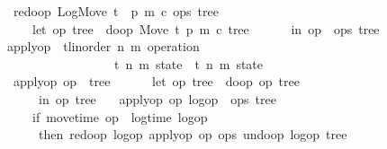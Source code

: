 \documentclass[sigconf]{acmart}
\renewcommand{\isacartoucheopen}{}
\renewcommand{\isacartoucheclose}{}
\begin{document}
\begin{figure}
\begin{isabellebody}
\ \ {\isacartoucheopen}redo{\isacharunderscore}op\ {\isacharparenleft}LogMove\ t\ {\isacharunderscore}\ p\ m\ c{\isacharparenright}\ {\isacharparenleft}ops{\isacharcomma}\ tree{\isacharparenright}\ {\isacharequal}\isanewline
\ \ \ \ \ {\isacharparenleft}let\ {\isacharparenleft}op{}{\isacharcomma}\ tree{}{\isacharparenright}\ {\isacharequal}\ do{\isacharunderscore}op\ {\isacharparenleft}Move\ t\ p\ m\ c{\isacharcomma}\ tree{\isacharparenright}\isanewline
\ \ \ \ \ \ in\ {\isacharparenleft}op{}\ {\isacharhash}\ ops{\isacharcomma}\ tree{}{\isacharparenright}{\isacharparenright}{\isacartoucheclose}\isanewline
\isanewline
{}\isamarkupfalse%
\ apply{\isacharunderscore}op\ {\isacharcolon}{\isacharcolon}\ {\isacartoucheopen}{\isacharparenleft}{\isacharprime}t{\isacharcolon}{\isacharcolon}{\isacharbraceleft}linorder{\isacharbraceright}{\isacharcomma}\ {\isacharprime}n{\isacharcomma}\ {\isacharprime}m{\isacharparenright}\ operation\ {\isasymRightarrow}\isanewline
\ \ \ \ \ \ \ \ \ \ \ \ \ \ \ \ \ \ {\isacharparenleft}{\isacharprime}t{\isacharcomma}\ {\isacharprime}n{\isacharcomma}\ {\isacharprime}m{\isacharparenright}\ state\ {\isasymRightarrow}\ {\isacharparenleft}{\isacharprime}t{\isacharcomma}\ {\isacharprime}n{\isacharcomma}\ {\isacharprime}m{\isacharparenright}\ state{\isacartoucheclose}\ \isanewline
\ \ {\isacartoucheopen}apply{\isacharunderscore}op\ op{}\ {\isacharparenleft}{\isacharbrackleft}{\isacharbrackright}{\isacharcomma}\ tree{}{\isacharparenright}\ {\isacharequal}\isanewline
\ \ \ \ \ {\isacharparenleft}let\ {\isacharparenleft}op{}{\isacharcomma}\ tree{}{\isacharparenright}\ {\isacharequal}\ do{\isacharunderscore}op\ {\isacharparenleft}op{}{\isacharcomma}\ tree{}{\isacharparenright}\isanewline
\ \ \ \ \ \ in\ {\isacharparenleft}{\isacharbrackleft}op{}{\isacharbrackright}{\isacharcomma}\ tree{}{\isacharparenright}{\isacharparenright}{\isacartoucheclose}\ {\isacharbar}\isanewline
\ \ {\isacartoucheopen}apply{\isacharunderscore}op\ op{}\ {\isacharparenleft}logop\ {\isacharhash}\ ops{\isacharcomma}\ tree{}{\isacharparenright}\ {\isacharequal}\isanewline
\ \ \ \ \ {\isacharparenleft}if\ move{\isacharunderscore}time\ op{}\ {\isacharless}\ log{\isacharunderscore}time\ logop\isanewline
\ \ \ \ \ \ then\ redo{\isacharunderscore}op\ logop\ {\isacharparenleft}apply{\isacharunderscore}op\ op{}\ {\isacharparenleft}ops{\isacharcomma}\ undo{\isacharunderscore}op\ {\isacharparenleft}logop{\isacharcomma}\ tree{}{\isacharparenright}{\isacharparenright}{\isacharparenright}\isanewline

\end{isabellebody}
\end{figure}
\end{document}
